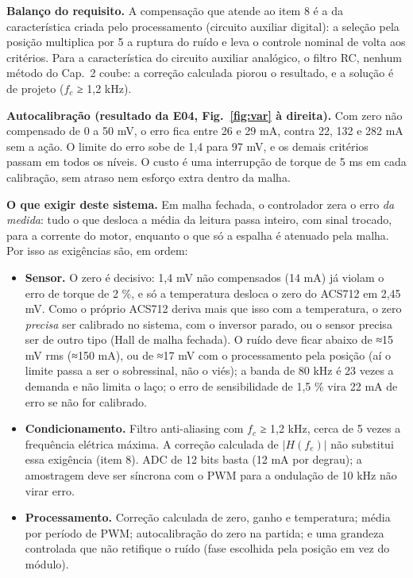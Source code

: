 \documentclass[10pt,a4paper]{article}
\newcommand{\R}[1]{\FloatBarrier\par\medskip\noindent{\large\bfseries #1}\par\smallskip}
\begin{document}
\textbf{Balanço do requisito.} A compensação que atende ao item 8 é a da característica criada pelo processamento (circuito auxiliar digital): a seleção pela posição multiplica por 5 a ruptura do ruído e leva o controle nominal de volta aos critérios. Para a característica do circuito auxiliar analógico, o filtro RC, nenhum método do Cap.~2 coube: a correção calculada piorou o resultado, e a solução é de projeto ($f_c$ ≥ 1,2 kHz).

\textbf{Autocalibração (resultado da E04, Fig.~\ref{fig:var} à direita).} Com zero não compensado de 0 a 50 mV, o erro fica entre 26 e 29 mA, contra 22, 132 e 282 mA sem a ação. O limite do erro sobe de 1,4 para 97 mV, e os demais critérios passam em todos os níveis. O custo é uma interrupção de torque de 5 ms em cada calibração, sem atraso nem esforço extra dentro da malha.

\R{9. Síntese e reprodução}
\textbf{O que exigir deste sistema.} Em malha fechada, o controlador zera o erro \emph{da medida}: tudo o que desloca a média da leitura passa inteiro, com sinal trocado, para a corrente do motor, enquanto o que só a espalha é atenuado pela malha. Por isso as exigências são, em ordem:
\begin{itemize}
\item \textbf{Sensor.} O zero é decisivo: 1,4 mV não compensados (14 mA) já violam o erro de torque de 2 \%, e só a temperatura desloca o zero do ACS712 em 2,45 mV. Como o próprio ACS712 deriva mais que isso com a temperatura, o zero \emph{precisa} ser calibrado no sistema, com o inversor parado, ou o sensor precisa ser de outro tipo (Hall de malha fechada). O ruído deve ficar abaixo de ≈15 mV rms (≈150 mA), ou de ≈17 mV com o processamento pela posição (aí o limite passa a ser o sobressinal, não o viés); a banda de 80 kHz é 23 vezes a demanda e não limita o laço; o erro de sensibilidade de 1,5 \% vira 22 mA de erro se não for calibrado.
\item \textbf{Condicionamento.} Filtro anti-aliasing com $f_c$ ≥ 1,2 kHz, cerca de 5 vezes a frequência elétrica máxima. A correção calculada de $|H(f_e)|$ não substitui essa exigência (item 8). ADC de 12 bits basta (12 mA por degrau); a amostragem deve ser síncrona com o PWM para a ondulação de 10 kHz não virar erro.
\item \textbf{Processamento.} Correção calculada de zero, ganho e temperatura; média por período de PWM; autocalibração do zero na partida; e uma grandeza controlada que não retifique o ruído (fase escolhida pela posição em vez do módulo).
\end{itemize}
\end{document}
